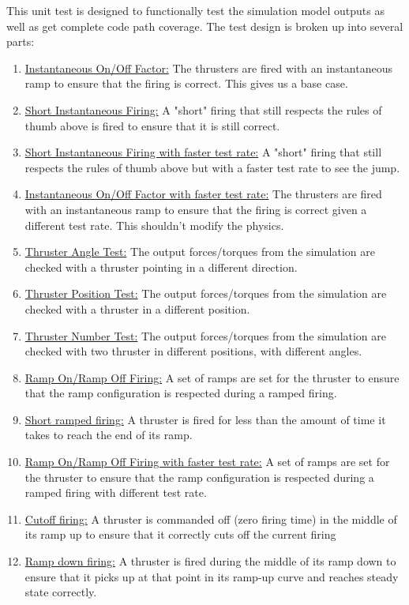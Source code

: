 \documentclass[]{BasiliskReportMemo}
\begin{document}
\noindent This unit test is designed to functionally test the simulation model 
outputs as well as get complete code path coverage.  The test design is broken 
up into several parts:\\
\begin{enumerate}
\item{\underline{Instantaneous On/Off Factor:} The thrusters are fired with an 
  instantaneous ramp to ensure that the firing is correct. This gives us a base case.}
\item{\underline{Short Instantaneous Firing:} A "short" firing that still respects the 
  rules of thumb above is fired to ensure that it is still correct.}
 \item{\underline{Short Instantaneous Firing with faster test rate:} A "short" firing that still respects the 
  rules of thumb above but with a faster test rate to see the jump.}
 \item{\underline{Instantaneous On/Off Factor with faster test rate:} The thrusters are fired with an 
  instantaneous ramp to ensure that the firing is correct given a different test rate. This shouldn't modify the physics.}
 \item{\underline{Thruster Angle Test:} The output forces/torques from the simulation 
  are checked with a thruster pointing in a different direction.}
   \item{\underline{Thruster Position Test:} The output forces/torques from the simulation 
  are checked with a thruster in a different position.}
   \item{\underline{Thruster Number Test:} The output forces/torques from the simulation 
  are checked with two thruster in different positions, with different angles.}
\item{\underline{Ramp On/Ramp Off Firing:} A set of ramps are set for the thruster to ensure 
  that the ramp configuration is respected during a ramped firing.}
  \item{\underline{Short ramped firing:} A thruster is fired for less than the amount of time it 
   takes to reach the end of its ramp.}
\item{\underline{Ramp On/Ramp Off Firing with faster test rate:} A set of ramps are set for the thruster to ensure 
  that the ramp configuration is respected during a ramped firing with different test rate.}
\item{\underline{Cutoff firing:} A thruster is commanded off (zero firing time) in the middle 
   of its ramp up to ensure that it correctly cuts off the current firing}
\item{\underline{Ramp down firing:} A thruster is fired during the middle of its ramp down 
   to ensure that it picks up at that point in its ramp-up curve and reaches 
   steady state correctly.}
\end{enumerate}
\end{document}
